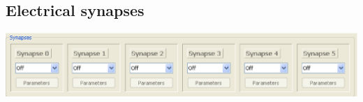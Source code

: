 \documentclass{article}
\begin{document}


\subsection{Electrical synapses}

\noindent
\parbox{\textwidth}{
\includegraphics[scale=0.5]{synapseBlock}
} \\[0.2cm]
\end{document}
